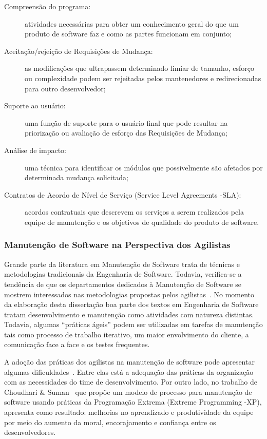 \begin{description}
	\item[Compreensão do programa:] atividades necessárias para obter um
		conhecimento geral do que um produto de software faz e como as partes
		funcionam em conjunto;
    \item[Aceitação/rejeição de Requisições de Mudança:] as modificações que
        ultrapassem determinado limiar de tamanho, esforço ou complexidade podem
        ser rejeitadas pelos mantenedores e redirecionadas para outro
        desenvolvedor;
	\item[Suporte ao usuário:] uma função de suporte para o usuário final que
		pode resultar na priorização ou avaliação de esforço das Requisições
		de Mudança;
	\item[Análise de impacto:] uma técnica para identificar os módulos que
		possivelmente são afetados por determinada mudança solicitada;
	\item[Contratos de Acordo de Nível de Serviço (Service Level Agreements
		\@-\@ SLA):] acordos contratuais que descrevem os serviços a serem
		realizados pela equipe de manutenção e os objetivos de qualidade do
		produto de software.
\end{description}

\subsubsection{Manutenção de Software na Perspectiva dos Agilistas}
\label{sub:manutenção_de_software_com_método_dos_agilistas}

Grande parte da literatura em Manutenção de Software trata de técnicas e
metodologias tradicionais da Engenharia de Software. Todavia, verifica-se a
tendência de que os departamentos dedicados à Manutenção de Software se mostrem
interessados nas metodologias propostas pelos agilistas~\cite{Heeager2015}.  No
momento da elaboração desta dissertação boa parte dos textos em Engenharia de
Software tratam desenvolvimento e manutenção como atividades com natureza
distintas. Todavia, algumas ``práticas ágeis'' podem ser utilizadas em tarefas
de manutenção tais como processo de trabalho iterativo, um maior envolvimento do
cliente, a comunicação face a face e os testes frequentes.

A adoção das práticas dos agilistas na manutenção de software pode apresentar
algumas dificuldades~\cite{1402140}. Entre elas está a adequação das práticas da
organização com as necessidades do time de desenvolvimento. Por outro lado, no
trabalho de Choudhari \& Suman~\cite{Choudhari:2014:EIM:2557833.2557845} que
propõe um modelo de processo para manutenção de software usando práticas da
Programação Extrema (Extreme Programming \@-\@ XP), apresenta como resultado:
melhorias no aprendizado e produtividade da equipe por meio do aumento da moral,
encorajamento e confiança entre os desenvolvedores.

